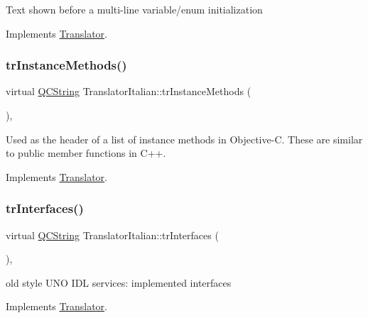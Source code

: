 Text shown before a multi-\/line variable/enum initialization 

Implements \mbox{\hyperlink{class_translator}{Translator}}.

\mbox{\label{class_translator_italian_aaa9ca1c3fda188f220c85c4bc623310a}} 
\subsubsection{\texorpdfstring{trInstanceMethods()}{trInstanceMethods()}}
{\footnotesize\ttfamily virtual \mbox{\hyperlink{class_q_c_string}{Q\+C\+String}} Translator\+Italian\+::tr\+Instance\+Methods (\begin{DoxyParamCaption}{ }\end{DoxyParamCaption})\hspace{0.3cm}{\ttfamily [inline]}, {\ttfamily [virtual]}}

Used as the header of a list of instance methods in Objective-\/C. These are similar to public member functions in C++. 

Implements \mbox{\hyperlink{class_translator}{Translator}}.

\mbox{\label{class_translator_italian_a4e17eb98672492f847bbcb418e949183}} 
\subsubsection{\texorpdfstring{trInterfaces()}{trInterfaces()}}
{\footnotesize\ttfamily virtual \mbox{\hyperlink{class_q_c_string}{Q\+C\+String}} Translator\+Italian\+::tr\+Interfaces (\begin{DoxyParamCaption}{ }\end{DoxyParamCaption})\hspace{0.3cm}{\ttfamily [inline]}, {\ttfamily [virtual]}}

old style U\+NO I\+DL services\+: implemented interfaces 

Implements \mbox{\hyperlink{class_translator}{Translator}}.

\mbox{\label{class_translator_italian_a4a199e3f0e0a4947d5d09960f57dae48}} 
